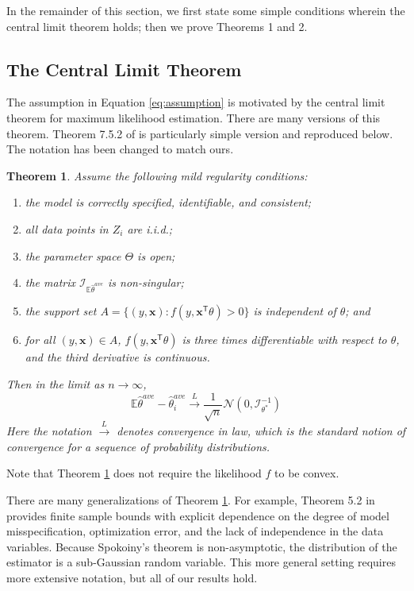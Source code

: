 \documentclass[twoside]{article}
\newtheorem{theorem}{Theorem}
\newcommand{\E}{\mathbb{E}}
\newcommand{\x}{\mathbf{x}}
\newcommand{\w}{\theta}
\newcommand{\wave}{\hat\w^{ave}}
\newcommand{\wtave}{\E\hat\w^{ave}}
\newcommand{\wstar}{{\w^{*}}}
\newcommand{\I}{\mathcal I}
\newcommand{\law}{\ensuremath{\xrightarrow{L}}}
\newcommand{\normal}[2]{\ensuremath{\mathcal{N}\left({{#1}},{{#2}}\right)}}
\newcommand{\trans}[1]{\ensuremath{{#1}^{\mathsf{T}}}}
\begin{document}
In the remainder of this section,
we first state some simple conditions wherein the central limit theorem holds;
then we prove Theorems 1 and 2.

\subsection { The Central Limit Theorem}
\label{sec:clt}

The assumption in Equation \ref{eq:assumption} is motivated by the central limit theorem for maximum likelihood estimation.
There are many versions of this theorem.
Theorem 7.5.2 of \cite{lehmann1999elements} is particularly simple version and reproduced below.
The notation has been changed to match ours.
\begin{theorem}
\label{thm:clt}
Assume the following mild regularity conditions:
\begin{enumerate}[noitemsep,topsep=0pt]%
\item the model is correctly specified, identifiable, and consistent;
\item all data points in $Z_i$ are i.i.d.;
\item the parameter space $\Theta$ is open;
\item the matrix $\I_{\wtave}$ is non-singular;
\item the support set $A = \{(y,\x) : f(y,\trans\x\theta) > 0\}$ is independent of $\theta$;
and \item for all $(y,\x)\in A$, $f(y,\trans\x\theta)$ is three times differentiable with respect to $\theta$,
and the third derivative is continuous.
\end{enumerate}
Then in the limit as $n\to\infty$,
\begin{equation*}
\wtave - \wave_i \law \frac{1}{\sqrt n} \normal{0}{\I^{-1}_\wstar}
\end{equation*}
Here the notation $\law$ denotes convergence in law,
which is the standard notion of convergence for a sequence of probability distributions.
\end{theorem}

Note that Theorem \ref{thm:clt} does not require the likelihood $f$ to be convex.

There are many generalizations of Theorem \ref{thm:clt}.
For example, Theorem 5.2 in \cite{spokoiny2012parametricestimation} provides finite sample bounds with explicit dependence on the degree of model misspecification, optimization error, and the lack of independence in the data variables.
Because Spokoiny's theorem is non-asymptotic,
the distribution of the estimator is a sub-Gaussian random variable.
This more general setting requires more extensive notation,
but all of our results hold.
\end{document}
